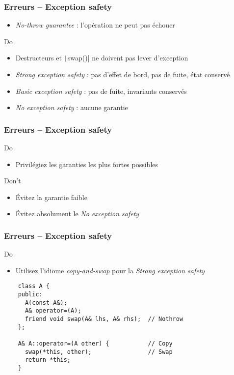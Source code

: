 \documentclass[C++.tex]{subfiles}
\begin{document}
\begin{frame}[fragile]
	\frametitle{Erreurs -- Exception safety}
	\begin{itemize}
		\item \textit{No-throw guarantee} : l'opération ne peut pas échouer
	\end{itemize}

	\begin{exampleblock}{Do}
		\begin{itemize}
			\item Destructeurs et \texttt|swap()| ne doivent pas lever d'exception
		\end{itemize}
	\end{exampleblock}

	\begin{itemize}
		\item \textit{Strong exception safety} : pas d'effet de bord, pas de fuite, état conservé
		\item \textit{Basic exception safety} : pas de fuite, invariants conservés
		\item \textit{No exception safety} : aucune garantie
	\end{itemize}
\end{frame}

\begin{frame}[fragile]
	\frametitle{Erreurs -- Exception safety}
	\begin{exampleblock}{Do}
		\begin{itemize}
			\item Privilégiez les garanties les plus fortes possibles
		\end{itemize}
	\end{exampleblock}

	\begin{alertblock}{Don't}
		\begin{itemize}
			\item Évitez la garantie faible
			\item Évitez absolument le \textit{No exception safety}
		\end{itemize}
	\end{alertblock}
\end{frame}

\begin{frame}[fragile]
	\frametitle{Erreurs -- Exception safety}
	\begin{exampleblock}{Do}
		\begin{itemize}
			\item Utilisez l'idiome \textit{copy-and-swap} pour la \textit{Strong exception safety}
		\end{itemize}
	\end{exampleblock}

	\begin{verbatim}
	class A {
	public:
	  A(const A&);
	  A& operator=(A);
	  friend void swap(A& lhs, A& rhs);  // Nothrow
	};

	A& A::operator=(A other) {           // Copy
	  swap(*this, other);                // Swap
	  return *this;
	}
	\end{verbatim}
\end{frame}
\end{document}
